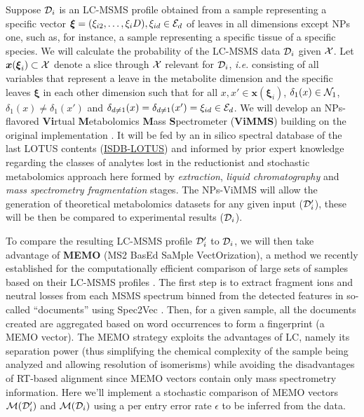 \documentclass[
11pt, %
oneside, %
english, %
singlespacing, %
headsepline, %
chapterinoneline, %
]{MastersDoctoralThesis} %
\def\E{\mathbb{E}}
\def\x{\boldsymbol{x}}
\def\bxi{\boldsymbol{\xi}}
\def\E{{\cal E}}
\def\N{{\cal N}}
\def\M{{\cal M}}
\def\X{{\cal X}}
\def\D{{\cal D}}
\begin{document}
Suppose $\D_i$ is an LC-MSMS profile obtained from a sample representing a specific vector $\bxi=(\xi_{i2}, \ldots, \xi_i{D}), \xi_{id} \in \E_d$ of leaves in all dimensions except NPs one, such as, for instance, a sample representing a specific tissue of a specific species. We will calculate the probability of the LC-MSMS data $\D_i$ given $\X$. Let $\x(\bxi_i) \subset \X$ denote a slice through $\X$ relevant for $\D_i$, \textit{i.e.} consisting of all variables that represent a leave in the metabolite dimension and the specific leaves $\bxi$ in each other dimension such that for all $x,x' \in \x(\bxi_i)$, $\delta_1(x) \in \N_1$, $\delta_1(x) \neq \delta_1(x')$ and $\delta_{d \neq 1}(x) =\delta_{d \neq 1}(x') = \xi_{id} \in \E_d$. We will develop an NPs-flavored \textbf{Vi}rtual \textbf{M}etabolomics \textbf{M}ass \textbf{S}pectrometer (\textbf{ViMMS}) building on the original implementation \cite{wandySilicoOptimizationMass2019}. It will be fed by an in silico spectral database of the last LOTUS contents (\href{https://doi.org/10.5281/zenodo.8287341}{ISDB-LOTUS}) and informed by prior expert knowledge regarding the classes of analytes lost in the reductionist and stochastic metabolomics approach here formed by \textit{extraction}, \textit{liquid chromatography} and \textit{mass spectrometry fragmentation} stages. The NPs-ViMMS will allow the generation of theoretical metabolomics datasets for any given input ($\D_i'$), these will be then be compared to experimental results ($\D_i$).

To compare the resulting LC-MSMS profile $\D_i'$ to $\D_i$, we will then take advantage of \textbf{MEMO} (MS2 BasEd SaMple VectOrization), a method we recently established for the computationally efficient comparison of large sets of samples based on their LC-MSMS profiles \cite{gaudryMEMOMassSpectrometryBased2022}. The first step is to extract fragment ions and neutral losses from each MSMS spectrum binned from the detected features in so-called “documents” using Spec2Vec \cite{huberSpec2VecImprovedMass2021}. Then, for a given sample, all the documents created are aggregated based on word occurrences to form a fingerprint (a MEMO vector). The MEMO strategy exploits the advantages of LC, namely its separation power (thus simplifying the chemical complexity of the sample being analyzed and allowing resolution of isomerisms) while avoiding the disadvantages of RT-based alignment since MEMO vectors contain only mass spectrometry information. Here we'll implement a stochastic comparison of MEMO vectors $\M(\D_i')$ and $\M(\D_i)$ using a per entry error rate $\epsilon$ to be inferred from the data.
\end{document}
